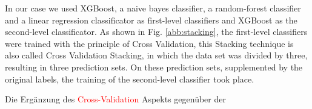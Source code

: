 In our case we used XGBoost, a naive bayes classifier, a random-forest classifier and a linear regression classificator as first-level classifiers and XGBoost as the second-level classificator. As shown in Fig. \ref{abb:stacking}, the first-level classifiers were trained with the principle of Cross Validation, this Stacking technique is also called Cross Validation Stacking, in which the data set was divided by three, resulting in three prediction sets. On these prediction sets, supplemented by the original labels, the training of the second-level classifier took place.

Die Ergänzung des \textcolor{red}{Cross-Validation} Aspekts gegenüber der 